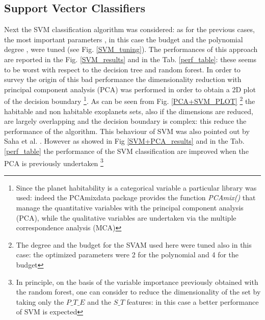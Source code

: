 \documentclass[
12pt, %
a4paper, %
oneside, %
headinclude,footinclude, %
BCOR5mm, %
]{scrartcl}
\begin{document}
\subsection{Support Vector Classifiers}
Next the SVM classification algorithm was considered: as for the previous cases, the most important parameters , in this case the budget and the polynomial degree , were tuned (see Fig. \ref{SVM_tuning}). The performances of this approach are reported in the Fig. \ref{SVM_results} and in the Tab. \ref{perf_table}: these seems to be worst with respect to the decision tree and random forest. In order to survey the origin of this bad performance the dimensionality reduction with principal component analysis (PCA) was performed in order to obtain a 2D plot of the decision boundary \footnote{Since the planet habitability is a categorical variable a particular library was used: indeed the PCAmixdata package provides the function \textit{PCAmix()} that manage the quantitative variables with the principal component analysis (PCA), while the qualitative variables are undertaken via the multiple correspondence analysis (MCA)}. As can be seen from Fig. \ref{PCA+SVM_PLOT} \footnote{The degree and the budget for the SVAM used here  were tuned also in this case: the optimized parameters were 2 for the polynomial and 4 for the budget} the habitable and non habitable exoplanets sets, also if the dimensions are reduced, are largely overlapping and the decision boundary is complex: this reduce the performance of the algorithm. This behaviour of SVM was also pointed out by Saha et al. \cite{saha2018machine}. However as showed in Fig \ref{SVM+PCA_results} and in the Tab. \ref{perf_table} the performance of the SVM classification are improved when the PCA is previously undertaken \footnote{In principle, on the basis of the variable importance previously obtained with the random forest, one can consider to reduce the dimensionality of the set by taking only the $P\_T\_E$ and the $S\_T$ features: in this case a better performance of SVM is expected}
\end{document}

